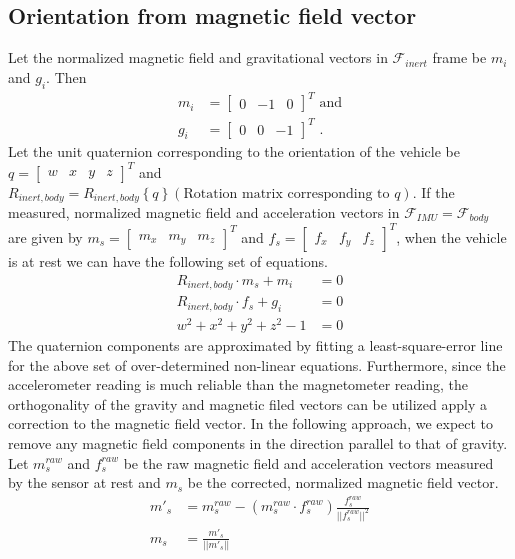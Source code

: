 \documentclass{article}
\begin{document}
\subsection{Orientation from magnetic field vector}
Let the normalized magnetic field and gravitational vectors in $\mathcal{F}_{inert}$ frame be $m_i$ and $g_i$. Then
\begin{align}
    m_i &= \left[\begin{matrix}0 & -1 & 0 \end{matrix}\right]^T \text{ and} \\
    g_i &= \left[\begin{matrix}0 & 0 & -1\end{matrix}\right]^T \text{ .}
\end{align}
Let the unit quaternion corresponding to the orientation of the vehicle be $q = \left[\begin{matrix}w & x & y & z\end{matrix}\right]^T$ and $R_{inert,body} = R_{inert,body}\left\{q\right\}\left(\text{Rotation matrix corresponding to }q\right)$. If the measured, normalized magnetic field and acceleration vectors in $\mathcal{F}_{IMU} = \mathcal{F}_{body}$ are given by $m_s = \left[\begin{matrix}m_x&m_y&m_z\end{matrix}\right]^T$ and $f_s = \left[\begin{matrix}f_x&f_y&f_z\end{matrix}\right]^T$, when the vehicle is at rest we can have the following set of equations.
\begin{align}
    R_{inert,body}\cdot m_s + m_i &= 0 \\
    R_{inert,body}\cdot f_s + g_i &= 0 \\
    w^2+x^2+y^2+z^2 -1 &= 0
\end{align}
The quaternion components are approximated by fitting a least-square-error line for the above set of over-determined non-linear equations. Furthermore, since the accelerometer reading is much reliable than the magnetometer reading, the orthogonality of the gravity and magnetic filed vectors can be utilized apply a correction to the magnetic field vector. In the following approach, we expect to remove any magnetic field components in the direction parallel to that of gravity. Let $m_s^{raw}$ and $f_s^{raw}$ be the raw magnetic field and acceleration vectors measured by the sensor at rest and $m_s$ be the corrected, normalized magnetic field vector.
\begin{align}
    m'_s &= m_s^{raw} - (m_s^{raw} \cdot f_s^{raw}) \frac{f_s^{raw}}{||f_s^{raw}||^2} \\
    m_s &= \frac{m'_s}{||m'_s||}
\end{align}
\end{document}
